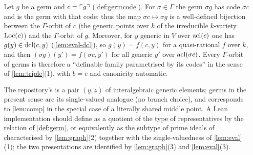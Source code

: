\begin{remark}\label{rem:code-param}
Let $g$ be a germ and $c=\ulcorner g\urcorner$ (\cref{def:germcode}).  For $\sigma\in\Gamma$ the germ
$\sigma g$ has code $\sigma c$ and is the germ with that code; thus the map
$\sigma c\mapsto\sigma g$ is a well-defined bijection between the $\Gamma$-orbit of $c$
(the generic points over $k$ of the irreducible $k$-variety $\operatorname{Loc}(c)$) and the
$\Gamma$-orbit of $g$.  Moreover, for $y$ generic in $V$ over $\operatorname{acl}(c)$ one has
$g(y)\in\operatorname{dcl}(c,y)$ (\cref{lem:eval-dcl}), so $g(y)=f(c,y)$ for a
quasi-rational $f$ over $k$, and then $(\sigma g)(y')=f(\sigma c,y')$ for all generic
$y'$ over $\operatorname{acl}(\sigma c)$.  Every $\Gamma$-orbit of germs is therefore a ``definable
family parametrised by its codes'' in the sense of \cref{lem:triple}(1), with
$b=c$ and canonicity automatic.
\end{remark}

\begin{leannote}
The repository's  is a pair $(y,z)$ of
interalgebraic generic elements; germs in the present sense are its single-valued
analogue (no branch choice), and 
corresponds to \cref{lem:comp} in the special case of a literally shared middle
point.  A Lean implementation should define  as a quotient of the type
of representatives by the relation of \cref{def:germ}, or equivalently as the subtype of
prime ideals of  characterised by
\cref{lem:graph}(2) together with the single-valuedness of \cref{lem:eval}(1); the two
presentations are identified by \cref{lem:graph}(3) and \cref{lem:eval}(3).
\end{leannote}
